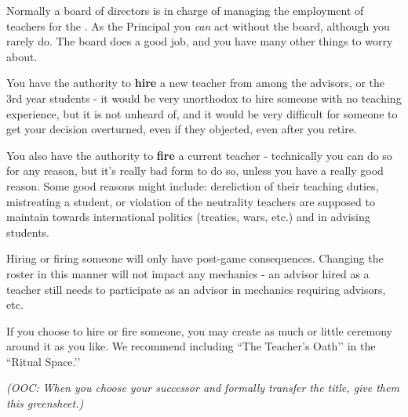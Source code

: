 \documentclass[green]{GL2020}
\begin{document}
\name{\gHireTeacher{}}

Normally a board of directors is in charge of managing the employment of teachers for the \pSchool{}. As the Principal you \emph{can} act without the board, although you rarely do. The board does a good job, and you have many other things to worry about.

You have the authority to \textbf{hire} a new teacher from among the advisors, or the 3rd year students - it would be very unorthodox to hire someone with no teaching experience, but it is not unheard of, and it would be very difficult for someone to get your decision overturned, even if they objected, even after you retire.

You also have the authority to \textbf{fire} a current teacher - technically you can do so for any reason, but it’s really bad form to do so, unless you have a really good reason. Some good reasons might include: dereliction of their teaching duties, mistreating a student, or violation of the neutrality teachers are supposed to maintain towards international politics (treaties, wars, etc.) and in advising students.

Hiring or firing someone will only have post-game consequences. Changing the roster in this manner will not impact any mechanics - an advisor hired as a teacher still needs to participate as an advisor in mechanics requiring advisors, etc.

If you choose to hire or fire someone, you may create as much or little ceremony around it as you like. We recommend including ``The Teacher’s Oath’’ in the ``Ritual Space.’’

\emph{(OOC: When you choose your successor and formally transfer the title, give them this greensheet.)}
\end{document}
